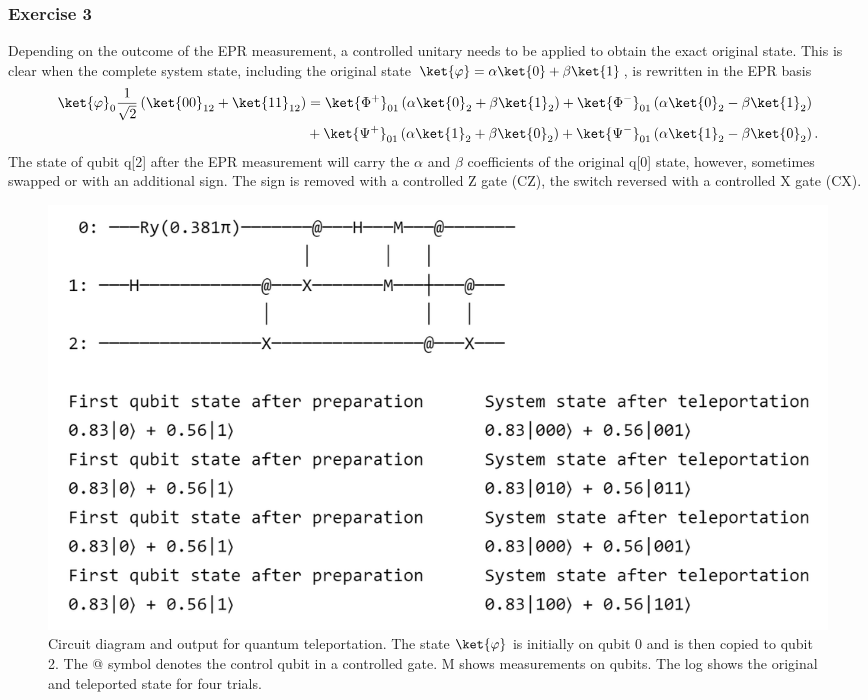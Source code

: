 \subsubsection{Exercise 3}
Depending on the outcome of the EPR measurement, a controlled unitary needs to be applied to obtain the exact original state. This is clear when the complete system state, including the original state $\ket{\varphi} = \alpha\ket{0} + \beta\ket{1}$, is rewritten in the EPR basis
\begin{equation}
\begin{aligned}
    \label{eq:decomposition}
    \ket{\varphi}_0\frac{1}{\sqrt{2}}\left(\ket{00}_{12} + \ket{11}_{12}\right) &= \ket{\Phi^+}_{01}\left(\alpha\ket{0}_2 + \beta\ket{1}_2\right) + \ket{\Phi^-}_{01}\left(\alpha\ket{0}_2 - \beta\ket{1}_2\right) \\
    &+ \ket{\Psi^+}_{01}\left(\alpha\ket{1}_2 + \beta\ket{0}_2\right)
    + \ket{\Psi^-}_{01}\left(\alpha\ket{1}_2 - \beta\ket{0}_2\right).
\end{aligned}
\end{equation}
The state of qubit q[2] after the EPR measurement will carry the $\alpha$ and $\beta$ coefficients of the original q[0] state, however, sometimes swapped or with an additional sign. The sign is removed with a controlled Z gate (CZ), the switch reversed with a controlled X gate (CX).
\begin{figure}
    \centering
    \includegraphics[width=0.8\linewidth]{tex/figures/exercise04.png}
    \caption{Circuit diagram and output for quantum teleportation. The state $\ket{\varphi}$ is initially on qubit 0 and is then copied to qubit 2. The @ symbol denotes the control qubit in a controlled gate. M shows measurements on qubits. The log shows the original and teleported state for four trials.}
    \label{fig:teleportation}
\end{figure}

